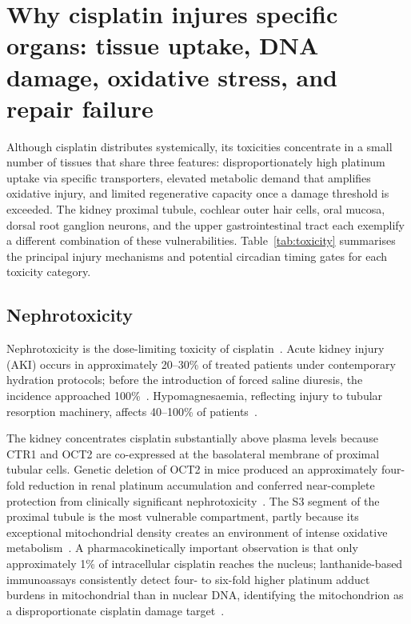 \documentclass[preprint,review,12pt]{elsarticle}
\begin{document}
\section{Why cisplatin injures specific organs: tissue uptake, DNA damage,
  oxidative stress, and repair failure}
\label{sec:toxicity}


Although cisplatin distributes systemically, its toxicities concentrate in a
small number of tissues that share three features: disproportionately high
platinum uptake via specific transporters, elevated metabolic demand that
amplifies oxidative injury, and limited regenerative capacity once a damage
threshold is exceeded. The kidney proximal tubule, cochlear outer hair cells,
oral mucosa, dorsal root ganglion neurons, and the upper gastrointestinal tract
each exemplify a different combination of these vulnerabilities.
Table~\ref{tab:toxicity} summarises the principal injury mechanisms and
potential circadian timing gates for each toxicity category.

\subsection{Nephrotoxicity}

Nephrotoxicity is the dose-limiting toxicity of cisplatin~\cite{Manohar2018}.
Acute kidney injury (AKI) occurs in approximately 20--30\% of treated patients
under contemporary hydration protocols; before the introduction of forced saline
diuresis, the incidence approached 100\%~\cite{Manohar2018}. Hypomagnesaemia,
reflecting injury to tubular resorption machinery, affects 40--100\% of
patients~\cite{Manohar2018}.

The kidney concentrates cisplatin substantially above plasma levels because CTR1
and OCT2 are co-expressed at the basolateral membrane of proximal tubular cells.
Genetic deletion of OCT2 in mice produced an approximately four-fold reduction
in renal platinum accumulation and conferred near-complete protection from
clinically significant nephrotoxicity~\cite{Manohar2018}. The S3 segment of the
proximal tubule is the most vulnerable compartment, partly because its
exceptional mitochondrial density creates an environment of intense oxidative
metabolism~\cite{Manohar2018, Karasawa2015}. A pharmacokinetically important
observation is that only approximately 1\% of intracellular cisplatin reaches
the nucleus; lanthanide-based immunoassays consistently detect four- to
six-fold higher platinum adduct burdens in mitochondrial than in nuclear
DNA, identifying the mitochondrion as a disproportionate cisplatin damage
target~\cite{Manohar2018}.
\end{document}
